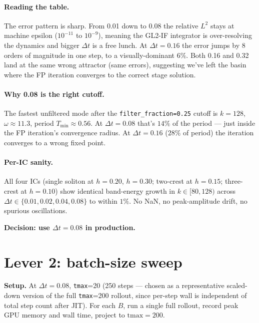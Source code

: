 \documentclass[11pt]{article}
\begin{document}
\paragraph{Reading the table.} The error pattern is sharp. From 0.01 down to 0.08 the
relative $L^2$ stays at machine epsilon ($10^{-11}$ to $10^{-9}$), meaning the
GL2-IF integrator is over-resolving the dynamics and bigger $\Delta t$ is a free lunch.
At $\Delta t=0.16$ the error jumps by 8 orders of magnitude in one step, to a
visually-dominant $6\%$. Both 0.16 and 0.32 land at the same wrong attractor (same
errors), suggesting we've left the basin where the FP iteration converges to the
correct stage solution.

\paragraph{Why 0.08 is the right cutoff.} The fastest unfiltered mode after the
\texttt{filter\_fraction=0.25} cutoff is $k=128$, $\omega \approx 11.3$, period
$T_\text{min} \approx 0.56$. At $\Delta t = 0.08$ that's $14\%$ of the period --- just
inside the FP iteration's convergence radius. At $\Delta t = 0.16$ ($28\%$ of period)
the iteration converges to a wrong fixed point.

\paragraph{Per-IC sanity.} All four ICs (single soliton at $h=0.20$, $h=0.30$;
two-crest at $h=0.15$; three-crest at $h=0.10$) show identical band-energy growth
in $k\in[80, 128)$ across $\Delta t \in \{0.01, 0.02, 0.04, 0.08\}$ to within $1\%$.
No NaN, no peak-amplitude drift, no spurious oscillations.

\textbf{Decision: use $\Delta t = 0.08$ in production.}

\section{Lever 2: batch-size sweep}
\label{sec:batch-sweep}

\textbf{Setup.} At $\Delta t = 0.08$, \texttt{tmax}=20 (250 steps --- chosen as a
representative scaled-down version of the full \texttt{tmax}=200 rollout, since per-step
wall is independent of total step count after JIT). For each $B$, run a single full
rollout, record peak GPU memory and wall time, project to $\text{tmax}=200$.
\end{document}
